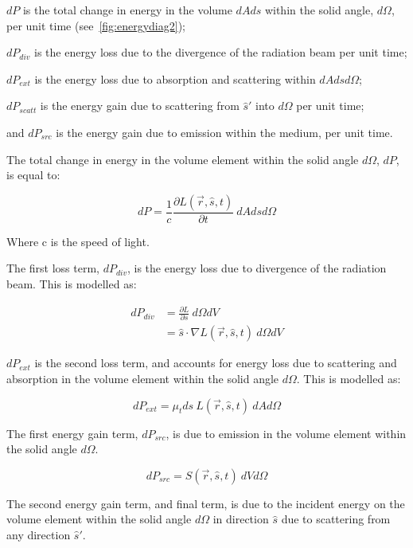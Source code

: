\indent $dP$ is the total change in energy in the volume $dAds$ within the solid angle, $d\Omega$, per unit time (see~\cref{fig:energydiag2});

\indent $dP_{div}$ is the energy loss due to the divergence of the radiation beam per unit time;

\indent $dP_{ext}$ is the energy loss due to absorption and scattering within $dAdsd\Omega$;

\indent $dP_{scatt}$ is the energy gain due to scattering from $\hat{s}'$ into $d\Omega$ per unit time;

\indent and $dP_{src}$ is the energy gain due to emission within the medium, per unit time.

\medskip

The total change in energy in the volume element within the solid angle $d\Omega$, $dP$, is equal to:

\begin{equation}
	dP=\frac{1}{c}\frac{\partial L(\vec{r},\hat{s},t)}{\partial t}\ dAdsd\Omega
	\label{eqn:p}
\end{equation}

\noindent Where c is the speed of light.

\medskip

The first loss term, $dP_{div}$, is the energy loss due to divergence of the radiation beam. This is modelled as:

\begin{align}
	dP_{div}&=\frac{\partial L}{\partial s}\ d\Omega dV \\
		    &=\hat{s} \cdot \nabla L(\vec{r},\hat{s},t)\ d\Omega dV
    \label{eqn:pdiv}
\end{align}

$dP_{ext}$ is the second loss term, and accounts for energy loss due to scattering and absorption in the volume element within the solid angle $d\Omega$. This is modelled as:

\begin{equation}
	dP_{ext}=\mu_t ds\ L(\vec{r},\hat{s},t)\ dAd\Omega
	\label{eqn:pext}
\end{equation}

The first energy gain term, $dP_{src}$, is due to emission in the volume element within the solid angle $d\Omega$. 

\begin{equation}
	dP_{src}=S(\vec{r},\hat{s},t)\ dVd\Omega
	\label{eqn:psrc}
\end{equation}

The second energy gain term, and final term, is due to the incident energy on the volume element within the solid angle $d\Omega$ in direction $\hat{s}$ due to scattering from any direction $\hat{s}'$.

